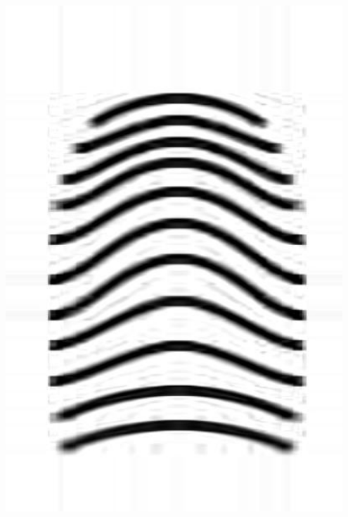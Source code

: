 \documentclass[letter]{amsart}
\begin{document}
\begin{minipage}[H]{0.33\textwidth}
    \centering
    \includegraphics[width=0.95\textwidth]{fingerprintARCH_svd.jpg}
\end{minipage}
\end{document}
